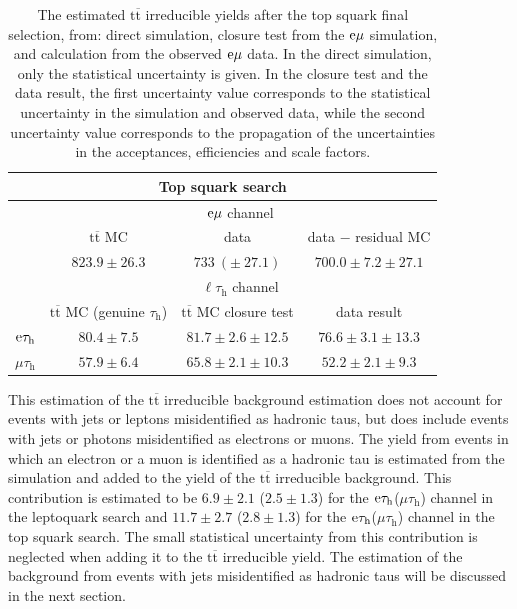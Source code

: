 \documentclass[12pt]{thesis}  %
\newcommand{\tauh}{\ensuremath{\tau_{\text{h}}}\xspace}
\newcommand{\Pe}{\ensuremath{\cmsSymbolFace{e}}\xspace}
\newcommand{\mutau}{\ensuremath{\mu\tauh}\xspace}
\newcommand{\etau}{\ensuremath{\Pe\tauh}\xspace}
\newcommand{\emu}{\ensuremath{\Pe\mu}\xspace}
\newcommand{\ltau}{\ensuremath{\ell\tauh}\xspace}
\renewcommand{\ttbar}{\ensuremath{\mathrm{t}\overline{\mathrm{t}}}\xspace}
\begin{document}
\begin{table}[hbt]
  \begin{center}
    \begin{tabular}{|l|c|c|c|}
      \multicolumn{4}{c}{Top squark search} \\
      \hline
      \multirow{3}{*}{} & \multicolumn{3}{c|}{$\emu$ channel} \\
      \cline{2-4}
      & \ttbar MC & data & data $-$ residual MC \\
      \cline{2-4}
      & $823.9 \pm 26.3$ & $733~(\pm~27.1)$ & $700.0 \pm 7.2 \pm 27.1$ \\
      \hline\hline
      \multirow{2}{*}{} & \multicolumn{3}{c|}{$\ltau$ channel} \\
      \hline
      channel & \ttbar MC (genuine \tauh) & \ttbar MC closure test & data result \\
      \hline
      $\etau$         & $80.4\pm7.5$ & $81.7\pm2.6\pm12.5$ & $76.6\pm3.1\pm13.3$ \\
      $\mutau$       & $57.9\pm6.4$ & $65.8\pm2.1\pm10.3$ & $52.2\pm2.1\pm9.3$ \\
      \hline
    \end{tabular}
    \caption{The estimated \ttbar irreducible yields after the top squark final selection, from: direct simulation, closure test from the $\emu$ simulation, and calculation from the observed $\emu$ data. In the direct simulation, only the statistical uncertainty is given. In the closure test and the data result, the first uncertainty value corresponds to the statistical uncertainty in the simulation and observed data, while the second uncertainty value corresponds to the propagation of the uncertainties in the acceptances, efficiencies and scale factors. }
    \label{tab:ttYieldsLQD}
  \end{center}
\end{table}

This estimation of the \ttbar irreducible background estimation does not account for events with jets or leptons misidentified as hadronic taus, but does include events with jets or photons misidentified as electrons or muons. The yield from events in which an electron or a muon is identified as a hadronic tau is estimated from the simulation and added to the yield of the \ttbar irreducible background. This contribution is estimated to be $6.9\pm 2.1$ ($2.5\pm 1.3$) for the \etau (\mutau) channel in the leptoquark search and $11.7\pm 2.7$ ($2.8 \pm 1.3$) for the \etau (\mutau) channel in the top squark search. The small statistical uncertainty from this contribution is neglected when adding it to the \ttbar irreducible yield. The estimation of the background from events with jets misidentified as hadronic taus will be discussed in the next section.
\end{document}
